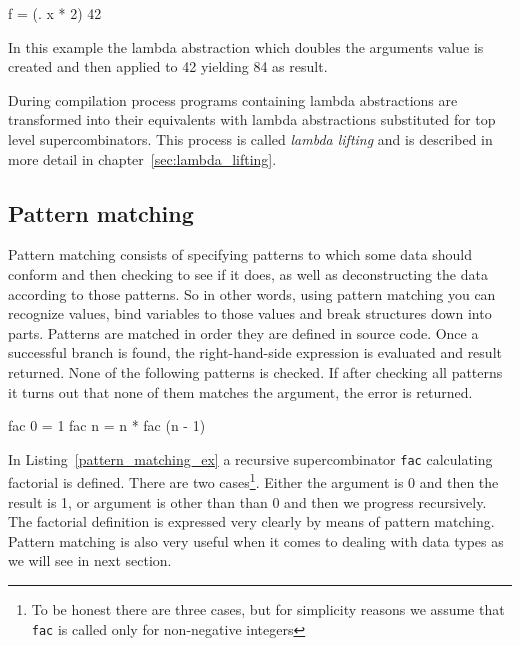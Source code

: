 \documentclass[12pt,a4paper]{report}
\begin{document}
\vspace*{0.2in}
\begin{code}[style=haskell,label=lambda_ex,caption={Lambda abstraction}]
f = (\x . x * 2) 42
\end{code}

In this example the lambda abstraction which doubles the arguments value is
created and then applied to 42 yielding 84 as result.

During compilation process programs containing lambda abstractions are
transformed into their equivalents with lambda abstractions substituted for top
level supercombinators. This process is called \textit{lambda lifting} and is
described in more detail in chapter~\ref{sec:lambda_lifting}.

\subsection{Pattern matching}

Pattern matching consists of specifying patterns to which some data should
conform and then checking to see if it does, as well as deconstructing the data
according to those patterns. So in other words, using pattern matching you can
recognize values, bind variables to those values and break structures down into
parts.
Patterns are matched in order they are defined in source code. Once a
successful branch is found, the right-hand-side expression is evaluated and
result returned. None of the following patterns is checked. If after checking
all patterns it turns out that none of them matches the argument, the error is
returned.

\vspace*{0.2in}
\begin{code}[style=haskell,label=pattern_matching_ex,caption={Factorial using pattern matching.}]
fac 0 = 1
fac n = n * fac (n - 1)
\end{code}

In Listing~\ref{pattern_matching_ex} a recursive supercombinator \texttt{fac}
calculating factorial is defined. There are two cases\footnote{To be honest
there are three cases, but for simplicity reasons we assume that
\texttt{fac} is called only for non-negative integers}. Either the
argument is 0 and then the result is 1, or argument is other than than 0 and
then we progress recursively. The factorial definition is expressed very
clearly by means of pattern matching.
Pattern matching is also very useful when it comes to dealing with data
types as we will see in next section.
\end{document}
